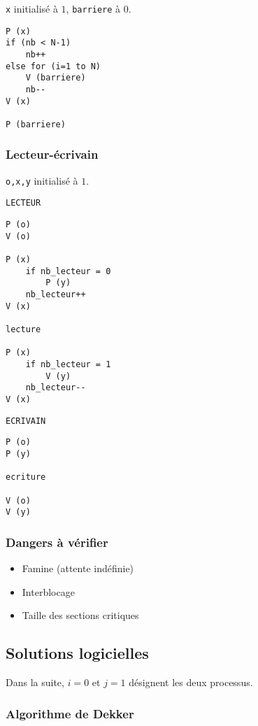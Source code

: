 \documentclass[a4paper]{article}
\begin{document}
\begin{multicols*}{2}
    \texttt{x} initialisé à $1$, \texttt{barriere} à $0$.

    \begin{lstlisting}[frame=shadowbox]
P (x)
if (nb < N-1)
    nb++
else for (i=1 to N) 
    V (barriere)
    nb--
V (x)

P (barriere)
    \end{lstlisting}

    \subsubsection{Lecteur-\'ecrivain}

    \texttt{o,x,y} initialisé à $1$.

    \texttt{LECTEUR}
    \begin{lstlisting}[frame=shadowbox]
P (o)
V (o)

P (x)
    if nb_lecteur = 0
        P (y)
    nb_lecteur++
V (x)

lecture

P (x)
    if nb_lecteur = 1
        V (y)
    nb_lecteur--
V (x)
    \end{lstlisting}


    \texttt{ECRIVAIN}
    \begin{lstlisting}[frame=shadowbox]
P (o)
P (y)

ecriture

V (o)
V (y)
    \end{lstlisting}

    \subsubsection{Dangers à vérifier}

    \begin{itemize}
        \item Famine (attente indéfinie)
        \item Interblocage
        \item Taille des sections critiques
    \end{itemize}

    \subsection{Solutions logicielles}

    Dans la suite, $i=0$ et $j=1$ désignent les deux processus.

    \subsubsection{Algorithme de Dekker}


\end{multicols*}
\end{document}
